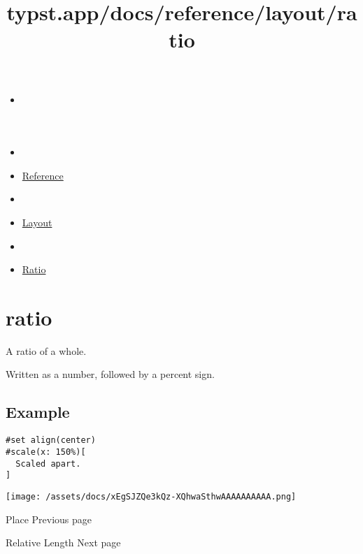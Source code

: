 \title{typst.app/docs/reference/layout/ratio}

\begin{itemize}
\tightlist
\item
  \href{/docs}{}
\item
  
\item
  \href{/docs/reference/}{Reference}
\item
  
\item
  \href{/docs/reference/layout/}{Layout}
\item
  
\item
  \href{/docs/reference/layout/ratio/}{Ratio}
\end{itemize}

\section{\texorpdfstring{{ ratio }}{ ratio }}\label{summary}

A ratio of a whole.

Written as a number, followed by a percent sign.

\subsection{Example}\label{example}

\begin{verbatim}
#set align(center)
#scale(x: 150%)[
  Scaled apart.
]
\end{verbatim}

\texttt{[image: /assets/docs/xEgSJZQe3kQz-XQhwaSthwAAAAAAAAAA.png]}

\href{/docs/reference/layout/place/}{\pandocbounded{}}

{ Place } { Previous page }

\href{/docs/reference/layout/relative/}{\pandocbounded{}}

{ Relative Length } { Next page }
